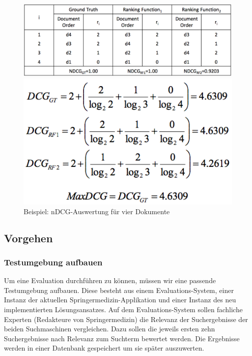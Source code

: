 \begin{figure}[H]
\centering
\vspace{-1em}
\caption[Beispiel: nDCG-Auswertung für vier Dokumente -  Quelle des Bildes: http://
web.stanford.edu/class/cs276/handouts/EvaluationNew.handout-6-per.pdf]{Beispiel: nDCG-Auswertung für vier Dokumente}
\label{fig:nDCG-Beispie}
\begin{minipage}{0.55\linewidth}
		\vspace{.5em}
        \centering
		\includegraphics[width=.8\linewidth]{gfx/NDCGBeispiel}
		\vspace{-2em}
\end{minipage}
\hfill
\begin{minipage}{0.35\linewidth}
		\centering
		\includegraphics[width=.75\linewidth]{gfx/DCGBerechnung}
		\vspace{-3.5em}
\end{minipage}
\end{figure}

\subsection{Vorgehen}
\label{sec:Evaluation:Aufbau:Vorgehen}

\subsubsection{Testumgebung aufbauen}
\label{sec:Evaluation:Aufbau:Vorgehen:Aufbau}

Um eine Evaluation durchführen zu können, müssen wir eine passende Testumgebung aufbauen. Diese besteht aus einem Evaluations-System, einer Instanz der aktuellen Springermedizin-Applikation und einer Instanz des neu implementierten Lösungsansatzes. Auf dem Evaluations-System sollen fachliche Experten (Redakteure von Springermedizin) die Relevanz der Suchergebnisse der beiden Suchmaschinen vergleichen. Dazu sollen die jeweils ersten zehn Suchergebnisse nach Relevanz zum Suchterm bewertet werden. Die Ergebnisse werden in einer Datenbank gespeichert um sie später auszuwerten. 

